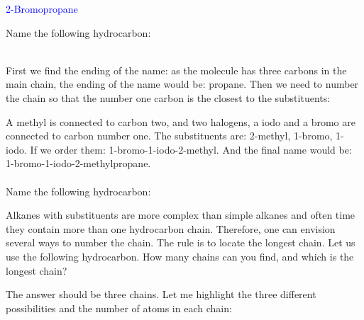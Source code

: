 \documentclass[main.tex]{subfiles}
\begin{document}
\begin{description}
\begin{center}  \hspace{0.5cm}\textcolor{blue}{2-Bromopropane}\end{center}




\begin{example} %
Name the following hydrocarbon:
\begin{center} \end{center}
\\
First we find the ending of the name: as the molecule has three carbons in the main chain, the ending of the name would be: propane. Then we need to number the chain so that the number one carbon is the closest to the substituents:
\begin{center} \end{center}
A methyl is connected to carbon two, and two halogens, a iodo and a bromo are connected to carbon number one. The substituents are: 2-methyl, 1-bromo, 1-iodo. If we order them: 1-bromo-1-iodo-2-methyl. And the final name would be: 1-bromo-1-iodo-2-methylpropane.
\\
\faDiamond\ \\
Name the following hydrocarbon:
\begin{center} \end{center}
\end{example}%




\item[\docfilehook{\smallpencil Finding the longest chain}{Finding the longest the chain}] Alkanes with substituents are more complex than simple alkanes and often time they contain more than one hydrocarbon chain. Therefore, one can envision several ways to number the chain. The rule is to locate the longest chain. Let us use the following hydrocarbon. How many chains can you find, and which is the longest chain?

\begin{center}  \end{center}
The answer should be three chains. Let me highlight the three different possibilities and the number of atoms in each chain:




\end{description}
\end{document}
